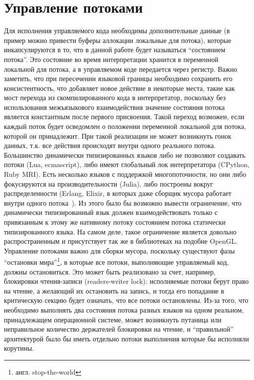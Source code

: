 \documentclass[times,specification,annotation]{itmo-student-thesis}
\begin{document}
\section{Управление потоками} \label{sec:thread-management}
Для исполнения управляемого кода необходимы дополнительные данные (в пример можно привести буферы аллокации локальные для потока), которые инкапсулируются в то, что в данной работе будет называться ``состоянием потока''. Это состояние во время интерпретации хранится в переменной локальной для потока, а в управляемом коде передается через регистр. Важно заметить, что при пересечении языковой границы необходимо сохранить его консистентность, что добавляет новое действие в некоторые места, такие как мост перехода из скомпилированного кода в интерпретатор, поскольку без использования межъязыкового взаимодействия значение состояния потока является константным после первого присвоения. Такой переход возможен, если каждый поток будет осведомлен о положении переменной локальной для потока, которой он принадлежит. При такой реализации не может возникнуть гонок данных, т.к. все действия происходят внутри одного реального потока.\\

Большинство динамически типизированных языков либо не позволяют создавать потоки (Lua, ecmascript), либо имеют глобальный лок интерпретатора (CPython, Ruby MRI). Есть несколько языков с поддержкой многопоточности, но они либо фокусируются на производительности (Julia), либо построены вокруг распределенности (Erlang, Elixir, в которых даже сборщик мусора работает внутри одного потока~\cite{erlang-gc}). Из этого было бы возможно вывести ограничение, что динамически типизированный язык должен взаимодействовать только с привязанным к этому же нативному потоку состоянием потока статически типизированного языка. На самом деле, такое ограничение является довольно распространенным и присутствует так же в библиотеках на подобие OpenGL.\\
Управление потоками важно для сборки мусора, поскольку существуют фазы ``остановки мира''\footnote{англ. stop-the-world}, в которые все потоки, выполняющие управляемый код, должны остановиться. Это может быть реализовано за счет, например, блокировки чтения-записи (readers-writer lock): исполняемые потоки берут право на чтение, а желающий их остановить на запись, и тогда его попадание в критическую секцию будет означать, что все потоки остановлены. Из-за того, что необходимо выполнять два состояния потока разных языков на одном реальном, принадлежащем операционной системе, может возникнуть путаница или неправильное количество держателей блокировки на чтение, и ``правильной'' архитектурой было бы иметь отдельно потоки выполнения которые бы исполняли корутины.
\end{document}
